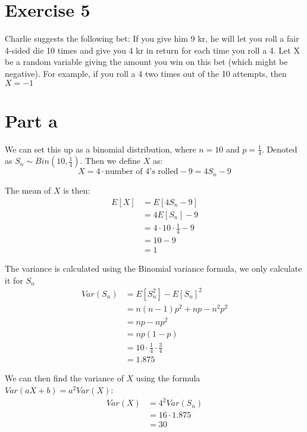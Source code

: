 \section{Exercise 5}
Charlie suggests the following bet: If you give him 9 kr, he will let you roll a fair 4-sided die 10 times and give you 4 kr in return for each time you roll a 4. Let X be a random variable giving the amount you win on this bet (which might be negative). For example, if you roll a 4 two times out of the 10 attempts, then $X = -1$

\section{Part a}

We can set this up as a binomial distribution, where $n=10$ and $p=\frac{1}{4}$. Denoted as $S_n \sim Bin\left(10, \frac{1}{4}\right)$. Then we define $X$ as:
\[
	X = 4 \cdot \text{number of 4's rolled} - 9 = 4S_n - 9
\]

The mean of $X$ is then:
\begin{align*}
	E[X] & = E[4S_n - 9]                      \\
	     & = 4E[S_n] - 9                      \\
	     & = 4 \cdot 10 \cdot \frac{1}{4} - 9 \\
	     & = 10 - 9                           \\
	     & = 1
\end{align*}

The variance is calculated using the Binomial variance formula, we only calculate it for $S_n$
\begin{align*}
	Var(S_n) & = E[S_n^2]-E[S_n]^2                      \\
	         & = n(n-1)p^2+np - n^2p^2                  \\
	         & = np-np^2                                \\
	         & = np(1-p)                                \\
	         & = 10 \cdot \frac{1}{4} \cdot \frac{3}{4} \\
	         & = 1.875
\end{align*}

We can then find the variance of $X$ using the formula $Var(aX+b) = a^2Var(X)$:
\begin{align*}
	Var(X) & = 4^2Var(S_n)    \\
	       & = 16 \cdot 1.875 \\
	       & = 30
\end{align*}

